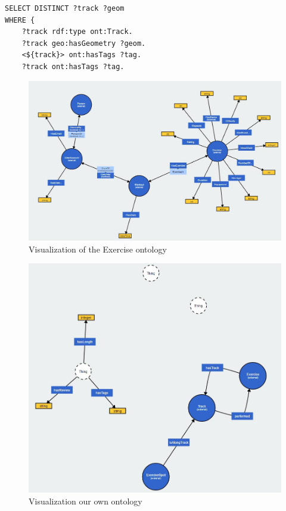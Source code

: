 \documentclass[11pt,a4paper]{scrreprt}
\begin{document}
\begin{lstlisting}[caption={Query for tracks with a tag common with a specified track }, label = query:trackstags ]
SELECT DISTINCT ?track ?geom
WHERE {
    ?track rdf:type ont:Track.
    ?track geo:hasGeometry ?geom.
    <${track}> ont:hasTags ?tag.
    ?track ont:hasTags ?tag.
\end{lstlisting}
\begin{figure}[h]
    \includegraphics[width=\textwidth]{exOntology.png}
    \caption{Visualization of the Exercise ontology}
    \label{db:exont}
\end{figure}
\begin{figure}[h]
    \includegraphics[width=\textwidth]{ownOntology.png}
    \caption{Visualization our own ontology}
    \label{db:ownont}
\end{figure}
\end{document}
